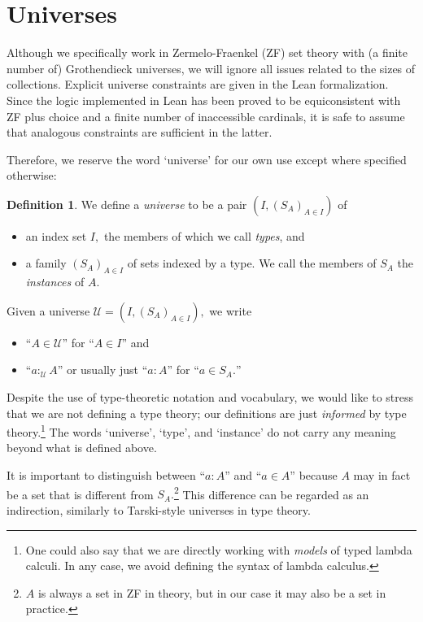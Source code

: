 \documentclass[a4paper]{article}
\theoremstyle{definition}
\newtheorem{definition}{Definition}[section]
\theoremstyle{remark}
\newcommand{\defn}{\emph}
\newcommand{\U}{\mathcal{U}}
\begin{document}
\section{Universes}
\label{sec:universes}

Although we specifically work in Zermelo-Fraenkel (ZF) set theory with (a finite number of)
Grothendieck universes, we will ignore all issues related to the sizes of collections.
Explicit universe constraints are given in the Lean formalization. Since the logic
implemented in Lean has been proved to be equiconsistent with ZF plus choice and a finite
number of inaccessible cardinals\cite{lean-type-theory}, it is safe to assume that analogous
constraints are sufficient in the latter.

Therefore, we reserve the word `universe' for our own use except where specified otherwise:

\begin{definition}
  We define a \defn{universe} to be a pair $(I, (S_A)_{A \in I})$ of
  \begin{itemize}
    \item an index set $I,$ the members of which we call \defn{types}, and
    \item a family $(S_A)_{A \in I}$ of sets indexed by a type. We call the members of $S_A$ the
    \defn{instances} of $A.$
  \end{itemize}
\end{definition}

Given a universe $\U = (I, (S_A)_{A \in I}),$ we write
\begin{itemize}
  \item ``$A \in \U$'' for ``$A \in I$'' and
  \item ``$a :_\U A$'' or usually just ``$a : A$'' for ``$a \in S_A.$''
\end{itemize}

Despite the use of type-theoretic notation and vocabulary, we would like to stress that we are not
defining a type theory; our definitions are just \emph{informed} by type theory.\footnote{One
could also say that we are directly working with \emph{models} of typed lambda calculi. In any case,
we avoid defining the syntax of lambda calculus.}
The words `universe', `type', and `instance' do not carry any meaning beyond what is defined above.

It is important to distinguish between ``$a : A$'' and ``$a \in A$'' because $A$ may in fact be a
set that is different from $S_A.$\footnote{$A$ is always a set in ZF in theory, but in our case it
may also be a set in practice.} This difference can be regarded as an indirection, similarly to
Tarski-style universes in type theory\cite{tarski}.
\end{document}
